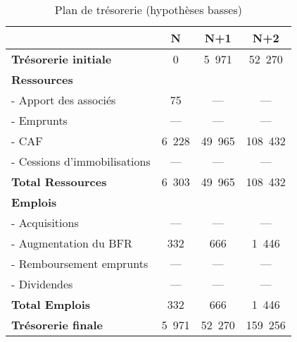		\begin{table}[h]
			\centering
			\begin{tabular}{|l|c|c|c|}
				\hline
				& {\bf N} & {\bf N+1} & {\bf N+2} \\
				\hline
				{\bf Tr\'esorerie initiale} & 0 & 5~971 & 52~270 \\
				\cline{2-4}
				{\bf Ressources} & & & \\
				- Apport des associ\'es & 75 & --- & --- \\
				- Emprunts & --- & --- & --- \\
				- CAF & 6~228 & 49~965 & 108~432 \\
				- Cessions d'immobilisations & --- & --- & --- \\
				\cline{2-4}
				{\bf Total Ressources} & 6~303 & 49~965 & 108~432 \\
				\cline{2-4}
				{\bf Emplois} & & & \\
				- Acquisitions & --- & --- & --- \\
				- Augmentation du BFR & 332 & 666 & 1~446 \\
				- Remboursement emprunts & --- & --- & --- \\
				- Dividendes & --- & --- & --- \\
				\cline{2-4}
				{\bf Total Emplois} & 332 & 666 & 1~446 \\
				\cline{2-4}
				{\bf Tr\'esorerie finale} & 5~971 & 52~270 & 159~256\\
				\hline
			\end{tabular}
			\caption{Plan de tr\'esorerie (hypoth\`eses basses)}
			\label{tab:planTresoB}
		\end{table}
		\vfill
